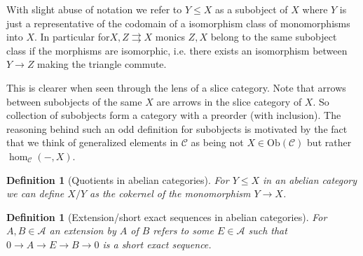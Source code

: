\documentclass[12pt]{article}
\numberwithin{equation}{section}
\newcounter{dummy} \numberwithin{dummy}{section}
\newtheorem{definition}[dummy]{Definition}
\begin{document}
	
	With slight abuse of notation we refer to $Y \leq X$ as a subobject of $X$ where $Y$ is just a representative of the codomain of a isomorphism class of monomorphisms into $X$. In particular for$X, Z \rightrightarrows X$ monics $Z, X$ belong to the same subobject class if the morphisms are isomorphic, i.e. there exists an isomorphism between $Y \to Z$ making the triangle commute. 
	
	This is clearer when seen through the lens of a slice category. Note that arrows between subobjects of the same $X$ are arrows in the slice category of $X$. So collection of subobjects form a category with a preorder (with inclusion). The reasoning behind such an odd definition for subobjects is motivated by the fact that we think of generalized elements in $\mathcal{C} $ as being not $X \in \mathrm{Ob}(\mathcal{C}) $ but rather $\hom_\mathcal{C}(-,X)$.
	
	\begin{definition}[Quotients in abelian categories]
		For $Y \leq X$ in an abelian category we can define $X/Y $ as the cokernel of the monomorphism $Y \to X$. 
	\end{definition}
	
	\begin{definition}[Extension/short exact sequences in abelian categories]
		For $ A, B \in \mathcal{A}$ an extension by $A$ of $B$ refers to some $E \in \mathcal{A}$ such that $0 \to A \to E \to B \to 0$ is a short exact sequence.
	\end{definition}
	
\end{document}
